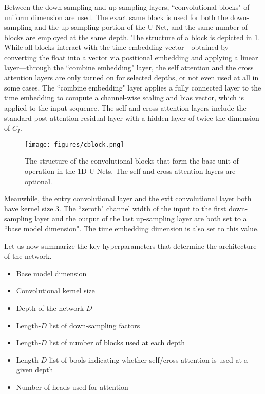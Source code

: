 \documentclass[nohyperref]{article}
\theoremstyle{plain}
\theoremstyle{definition}
\theoremstyle{remark}
\begin{document}
Between the down-sampling and up-sampling layers, ``convolutional blocks" of uniform dimension are used. The exact same block is used for both the down-sampling and the up-sampling portion of the U-Net, and the same number of blocks are employed at the same depth. The structure of a block is depicted in \cref{figure:cblock}. While all blocks interact with the time embedding vector---obtained by converting the float into a vector via positional embedding and applying a linear layer---through the ``combine embedding" layer, the self attention and the cross attention layers are only turned on for selected depths, or not even used at all in some cases. The ``combine embedding" layer applies a fully connected layer to the time embedding to compute a channel-wise scaling and bias vector, which is applied to the input sequence. The self and cross attention layers include the standard post-attention residual layer with a hidden layer of twice the dimension of $C_I$.

\begin{figure}[h!]
\begin{center}
\centerline{
\texttt{[image: figures/cblock.png]}}
\caption{The structure of the convolutional blocks that form the base unit of operation in the 1D U-Nets. The self and cross attention layers are optional.}
\label{figure:cblock}
\end{center}
\vskip -0.2in
\end{figure}

Meanwhile, the entry convolutional layer and the exit convolutional layer both have kernel size 3. The ``zeroth" channel width of the input to the first down-sampling layer and the output of the last up-sampling layer are both set to a ``base model dimension". The time embedding dimension is also set to this value.

Let us now summarize the key hyperparameters that determine the architecture of the network.
\begin{itemize}
\item Base model dimension
\item Convolutional kernel size
\item Depth of the network $D$
\item Length-$D$ list of down-sampling factors
\item Length-$D$ list of number of blocks used at each depth
\item Length-$D$ list of bools indicating whether self/cross-attention is used at a given depth
\item Number of heads used for attention
\end{itemize}
\end{document}
